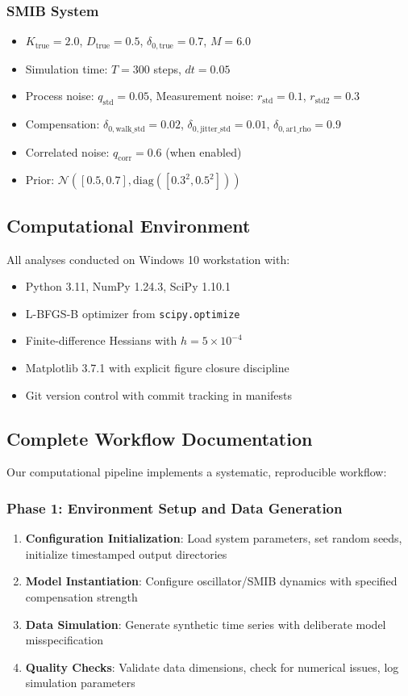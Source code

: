\documentclass[conference]{IEEEtran}
\begin{document}
\subsubsection{SMIB System}  
\begin{itemize}
\item $K_{\text{true}} = 2.0$, $D_{\text{true}} = 0.5$, $\delta_{0,\text{true}} = 0.7$, $M = 6.0$
\item Simulation time: $T = 300$ steps, $dt = 0.05$ 
\item Process noise: $q_{\text{std}} = 0.05$, Measurement noise: $r_{\text{std}} = 0.1$, $r_{\text{std2}} = 0.3$
\item Compensation: $\delta_{0,\text{walk\_std}} = 0.02$, $\delta_{0,\text{jitter\_std}} = 0.01$, $\delta_{0,\text{ar1\_rho}} = 0.9$
\item Correlated noise: $q_{\text{corr}} = 0.6$ (when enabled)
\item Prior: $\mathcal{N}([0.5, 0.7], \text{diag}([0.3^2, 0.5^2]))$
\end{itemize}

\subsection{Computational Environment}
All analyses conducted on Windows 10 workstation with:
\begin{itemize}
\item Python 3.11, NumPy 1.24.3, SciPy 1.10.1
\item L-BFGS-B optimizer from \texttt{scipy.optimize}
\item Finite-difference Hessians with $h = 5 \times 10^{-4}$
\item Matplotlib 3.7.1 with explicit figure closure discipline
\item Git version control with commit tracking in manifests
\end{itemize}

\subsection{Complete Workflow Documentation}
Our computational pipeline implements a systematic, reproducible workflow:

\subsubsection{Phase 1: Environment Setup and Data Generation}
\begin{enumerate}
\item \textbf{Configuration Initialization}: Load system parameters, set random seeds, initialize timestamped output directories
\item \textbf{Model Instantiation}: Configure oscillator/SMIB dynamics with specified compensation strength
\item \textbf{Data Simulation}: Generate synthetic time series with deliberate model misspecification
\item \textbf{Quality Checks}: Validate data dimensions, check for numerical issues, log simulation parameters
\end{enumerate}
\end{document}
